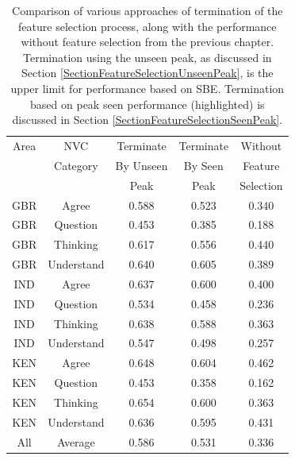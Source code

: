 \begin{table}[htb]
\centering
\caption[Comparison of various approaches of termination of the feature selection process, along with the performance without feature selection from the previous chapter.]{Comparison of various approaches of termination of the feature selection process, along with the performance without feature selection from the previous chapter. Termination using the unseen peak, as discussed in Section \ref{SectionFeatureSelectionUnseenPeak}, is the upper limit for performance based on \ac{SBE}. Termination based on peak seen performance (highlighted) is discussed in Section \ref{SectionFeatureSelectionSeenPeak}.}
\begin{tabular}{ | c | c | c | c | c | }
\hline
Area & NVC       & Terminate & \cellcolor[gray]{0.8}Terminate & Without  \\
     & Category  & By Unseen & \cellcolor[gray]{0.8}By Seen   & Feature \\
     &           & Peak      & \cellcolor[gray]{0.8}Peak      & Selection \\
\hline
GBR & Agree      & 0.588 & \cellcolor[gray]{0.8}0.523 & 0.340 \\
GBR & Question   & 0.453 & \cellcolor[gray]{0.8}0.385 & 0.188 \\
GBR & Thinking   & 0.617 & \cellcolor[gray]{0.8}0.556 & 0.440 \\
GBR & Understand & 0.640 & \cellcolor[gray]{0.8}0.605 & 0.389 \\
\hline
IND & Agree      & 0.637 & \cellcolor[gray]{0.8}0.600 & 0.400 \\
IND & Question   & 0.534 & \cellcolor[gray]{0.8}0.458 & 0.236 \\
IND & Thinking   & 0.638 & \cellcolor[gray]{0.8}0.588 & 0.363 \\
IND & Understand & 0.547 & \cellcolor[gray]{0.8}0.498 & 0.257 \\
\hline
KEN & Agree      & 0.648 & \cellcolor[gray]{0.8}0.604 & 0.462 \\
KEN & Question   & 0.453 & \cellcolor[gray]{0.8}0.358 & 0.162 \\
KEN & Thinking   & 0.654 & \cellcolor[gray]{0.8}0.600 & 0.363 \\
KEN & Understand & 0.636 & \cellcolor[gray]{0.8}0.595 & 0.431 \\
\hline
All & Average    & 0.586 & \cellcolor[gray]{0.8}0.531 & 0.336 \\
\hline
\end{tabular}
\label{TableShuffledFoldsTerminationOnSeenComparison}
\end{table}

